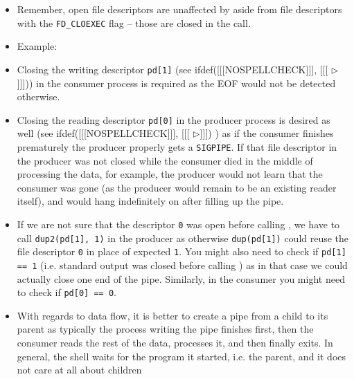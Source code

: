 
\begin{slide}
\begin{center}

\end{center}
\end{slide}

\label{FDSHARING}

\begin{itemize}
\item Remember, open file descriptors are unaffected by  aside from
file descriptors with the \texttt{FD\_CLOEXEC} flag -- those are closed in the
  call.
\item Example: 
\item Closing the writing descriptor \texttt{pd[1]} (see
ifdef([[[NOSPELLCHECK]]], [[[{\color[rgb]{1,0,0} $\triangleright$}]]]))
in the consumer process is required as the EOF would not be detected otherwise.
\item Closing the reading descriptor \texttt{pd[0]} in the producer process is
desired as well (see
ifdef([[[NOSPELLCHECK]]], [[[{\color[rgb]{1,0,0} $\triangleright$}]]])
) as if the consumer finishes prematurely the producer properly gets a
\texttt{SIGPIPE}.
If that file descriptor in the producer was not closed while the consumer died
in the middle of processing the data, for example, the producer would not learn
that the consumer was gone (as the producer would remain to be an existing
reader itself), and would hang indefinitely on  after filling up
the pipe.
\item If we are not sure that the descriptor \texttt{0} was open before calling
, we have to call \texttt{dup2(pd[1], 1)} in the producer as
otherwise \texttt{dup(pd[1])} could reuse the file descriptor \texttt{0} in
place of expected \texttt{1}.  You might also need to check if \verb#pd[1] == 1#
(i.e. standard output was closed before calling ) as in that case we
could actually close one end of the pipe.  Similarly, in the consumer you might
need to check if \verb#pd[0] == 0#.
\item With regards to data flow, it is better to create a pipe from a child
to its parent as typically the
process writing the pipe finishes first, then the consumer reads the rest of the
data, processes it, and then finally exits.  In general, the shell waits for the
program it started, i.e. the parent, and it does not care at all about children

\end{itemize}
